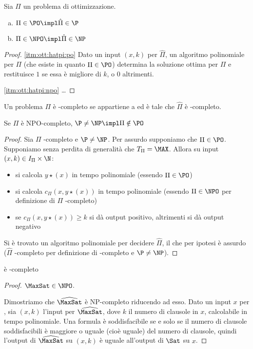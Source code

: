 \begin{theorem}
	Sia $\Pi$ un problema di ottimizzazione.
	\begin{enumerate}[(a)]
		\item \label{itm:ott:hatpi:po}$\Pi\in\PO \impl\hat\Pi\in\P$
		\item \label{itm:ott:hatpi:npo}$\Pi\in\NPO \impl\hat\Pi\in\NP$
	\end{enumerate}
\end{theorem}
\begin{proof}
	\ref{itm:ott:hatpi:po} Dato un input $(x,k)$ per $\hat\Pi$, un algoritmo polinomiale per $\Pi$ (che esiste in quanto $\Pi\in\PO$) determina la soluzione ottima per $\Pi$ e restituisce $1$ se essa è migliore di $k$, o $0$ altrimenti.

	\ref{itm:ott:hatpi:npo} \dots
\end{proof}

\begin{defin}
	Un problema $\Pi$ è \NPO-completo se appartiene a \NPO ed è tale che $\hat\Pi$ è \NP-completo.
\end{defin}

\begin{theorem}
	Se $\Pi$ è NPO-completo, $\P\neq \NP\impl\Pi\notin\PO$
\end{theorem}
\begin{proof}
	Sia $\Pi$ \NPO-completo e $\P\neq\NP$.	Per assurdo supponiamo che $\Pi\in\PO$. Supponiamo senza perdita di generalità che $T_\Pi=\MAX$. Allora su input $(x,k)\in I_\Pi\times\N$:
	\begin{itemize}
		\item si calcola $y\star(x)$ in tempo polinomiale (essendo $\Pi\in\PO$)
		\item si calcola $c_\Pi(x,y\star(x))$ in tempo polinomiale (essendo $\Pi\in\NPO$ per definizione di $\Pi$ \NPO-completo)
		\item se $c_\Pi(x,y\star(x))\geq k$ si dà output positivo, altrimenti si dà output negativo
	\end{itemize}
	Si è trovato un algoritmo polinomiale per decidere $\hat\Pi$, il che per ipotesi è assurdo ($\hat\Pi$ \NP-completo per definizione di \NPO-completo e $\P\neq \NP$).
\end{proof}

\begin{theorem}
	\MaxSat è \NPO-completo
\end{theorem}
\begin{proof}
	$\MaxSat\in\NPO$.

	Dimostriamo che $\widehat{\MaxSat}$ è NP-completo riducendo \Sat ad esso. Dato un input $x$ per \Sat, sia $(x,k)$ l'input per $\widehat{\MaxSat}$, dove $k$ il numero di clausole in $x$, calcolabile in tempo polinomiale. Una formula è soddisfacibile se e solo se il numero di clausole soddisfacibili è maggiore o uguale (cioè uguale) del numero di clausole, quindi l'output di $\widehat{\MaxSat}$ su $(x,k)$ è uguale all'output di $\Sat$ su $x$.
\end{proof}


